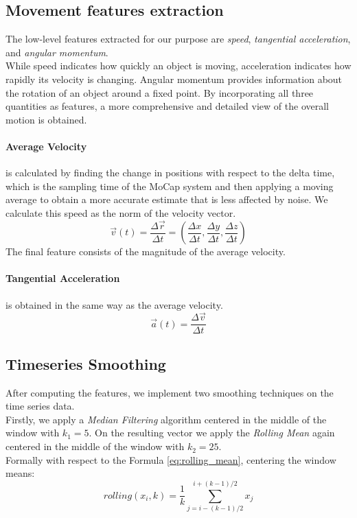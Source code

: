 \subsection{Movement features extraction}
\label{subsec:alg_features}
The low-level features extracted for our purpose are \textit{speed}, \textit{tangential acceleration}, and \textit{angular momentum}. \\
While speed indicates how quickly an object is moving, acceleration indicates how rapidly its velocity is changing.
Angular momentum provides information about the rotation of an object around a fixed point.
By incorporating all three quantities as features, a more comprehensive and detailed view of the overall motion is obtained.

\paragraph{Average Velocity} is calculated by finding the change in positions with respect to the delta time, which is the sampling time of the MoCap system and then applying a moving average to obtain a more accurate estimate that is less affected by noise.
We calculate this speed as the norm of the velocity vector.
\begin{equation}
  \vec{v}(t) = \frac{\Delta\vec{r}}{\Delta  t} = \left(\frac{\Delta x}{\Delta t}, \frac{\Delta  y}{\Delta t}, \frac{\Delta z}{\Delta t}\right)
\end{equation}
The final feature consists of the magnitude of the average velocity.

\paragraph{Tangential Acceleration} is obtained in the same way as the average velocity.
\begin{equation}
  \vec{a}(t) = \frac{\Delta\vec{v}}{\Delta t}
\end{equation}

\subsection{Timeseries Smoothing}
After computing the features, we implement two smoothing techniques on the time series data. \\
Firstly, we apply a \textit{Median Filtering} algorithm centered in the middle of the window with $k_1 = 5$. 
On the resulting vector we apply the \textit{Rolling Mean} again centered in the middle of the window with $k_2 = 25 $. \\
Formally with respect to the Formula \ref{eq:rolling_mean}, centering the window means:
\begin{equation}
  rolling(x_i,k) = \frac{1}{k} \sum_{j=i-(k-1)/2}^{i+(k-1)/2} x_j
\end{equation}

